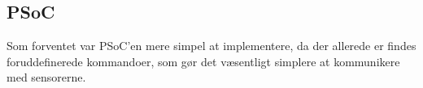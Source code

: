 \subsection{PSoC} \label{sec:swi_psoc_board}

Som forventet var PSoC'en mere simpel at implementere, da der allerede er findes foruddefinerede \IIC kommandoer, som gør det væsentligt simplere at kommunikere med sensorerne. 

